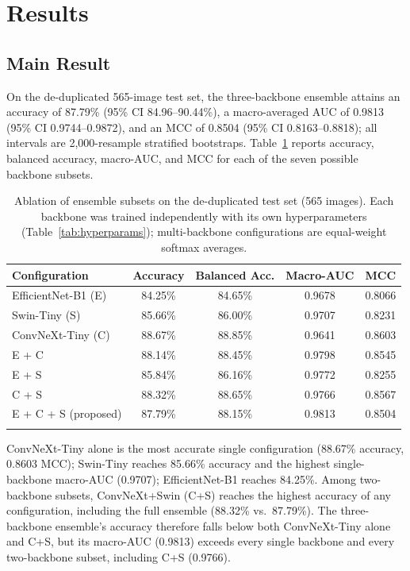 \documentclass[VANCOUVER,twocolumn]{USG}
\begin{document}
\section{Results}\label{sec:results}

\subsection{Main Result}

On the de-duplicated 565-image test set, the three-backbone ensemble
attains an accuracy of 87.79\% (95\% CI 84.96--90.44\%), a macro-averaged
AUC of 0.9813 (95\% CI 0.9744--0.9872), and an MCC of 0.8504 (95\% CI
0.8163--0.8818); all intervals are 2,000-resample stratified bootstraps.
Table~\ref{tab:ablation} reports accuracy, balanced accuracy, macro-AUC,
and MCC for each of the seven possible backbone subsets.

\begin{table}[htbp]
\caption{Ablation of ensemble subsets on the de-duplicated test set (565
images). Each backbone was trained independently with its own
hyperparameters (Table~\ref{tab:hyperparams}); multi-backbone
configurations are equal-weight softmax averages.}\label{tab:ablation}
\begin{tabular}{@{}lcccc@{}}
\toprule
Configuration & Accuracy & Balanced Acc. & Macro-AUC & MCC \\
\midrule
EfficientNet-B1 (E) & 84.25\% & 84.65\% & 0.9678 & 0.8066 \\
Swin-Tiny (S) & 85.66\% & 86.00\% & 0.9707 & 0.8231 \\
ConvNeXt-Tiny (C) & 88.67\% & 88.85\% & 0.9641 & 0.8603 \\
\midrule
E + C & 88.14\% & 88.45\% & 0.9798 & 0.8545 \\
E + S & 85.84\% & 86.16\% & 0.9772 & 0.8255 \\
C + S & 88.32\% & 88.65\% & 0.9766 & 0.8567 \\
\midrule
E + C + S (proposed) & 87.79\% & 88.15\% & 0.9813 & 0.8504 \\
\botrule
\end{tabular}
\end{table}

ConvNeXt-Tiny alone is the most accurate single configuration (88.67\%
accuracy, 0.8603 MCC); Swin-Tiny reaches 85.66\% accuracy and the highest
single-backbone macro-AUC (0.9707); EfficientNet-B1 reaches 84.25\%. Among
two-backbone subsets, ConvNeXt+Swin (C+S) reaches the highest accuracy of
any configuration, including the full ensemble (88.32\% vs.\ 87.79\%). The
three-backbone ensemble's accuracy therefore falls below both
ConvNeXt-Tiny alone and C+S, but its macro-AUC (0.9813) exceeds every
single backbone and every two-backbone subset, including C+S (0.9766).
\end{document}
